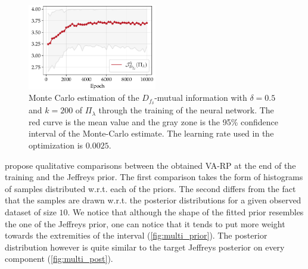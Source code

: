 \begin{figure}[h]
    \centering
    \includegraphics[width=5.625cm]{figures/va-rp/MI_multinomial.pdf}
    \caption{Monte Carlo estimation of the $D_{f_\delta}$-mutual information with $\delta=0.5$ and $k=200$ of $\varPi_\lambda$ through the training of the neural network. %
    The red curve is the mean value and the gray zone is the 95\% confidence interval of the Monte-Carlo estimate. The learning rate used in the optimization is $0.0025$.}
    \label{fig:multi_MI}
\end{figure}



 propose qualitative comparisons between the obtained VA-RP at the end of the training and the Jeffreys prior.
The first comparison takes the form of histograms of samples distributed w.r.t. each of the priors. 
The second differs from the fact that the samples are drawn w.r.t. the posterior distributions for a given observed dataset of size $10$.
We notice that although the shape of the fitted prior resembles the one of the Jeffreys prior, one can notice that it tends to put more weight towards the extremities of the interval (\cref{fig:multi_prior}). The posterior distribution however is quite similar to the target Jeffreys posterior on every component (\cref{fig:multi_post}).


